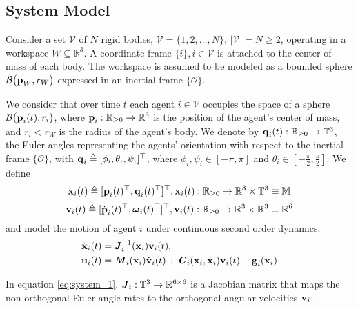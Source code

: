 \subsection{System Model}

Consider a set $\mathcal{V}$ of $N$ rigid bodies,
$\mathcal{V} = \{ 1,2, \ldots, N\}$, $|\mathcal{V}| = N \geq 2$, operating in
a workspace $W\subseteq \mathbb{R}^3$. A coordinate frame
$\{i\}, i\in\mathcal{V}$ is attached to the center of mass of each body.
The workspace is assumed to be modeled as a
bounded sphere $\mathcal{B}\big(\bm{\mathbf{p}}_W,r_W\big)$ expressed in an inertial frame
$\{\mathcal{O}\}$.

We consider that over time $t$ each agent $i \in \mathcal{V}$ occupies the
space of a sphere $\mathcal{B}\big(\bm{\mathbf{p}}_i(t), r_i\big)$, where
$\bm{\mathbf{p}}_i : \mathbb{R}_{\geq 0} \to \mathbb{R}^3$
is the position of the agent's center of mass, and $r_i < r_W$ is the radius of the
agent's body. We denote by $\bm{\mathbf{q}}_i(t):\mathbb{R}_{\geq 0} \to \mathbb{T}^3$,
the Euler angles representing the agents' orientation with respect to the
inertial frame $\{\mathcal{O}\}$,
with $\bm{\mathbf{q}}_i \triangleq [\phi_i,\theta_i,\psi_i]^{\top}$, where
$\phi_i, \psi_i \in [-\pi, \pi]$ and
$\theta_i \in [-\frac{\pi}{2}, \frac{\pi}{2}]$. We define
$$\bm{\mathbf{x}}_i (t)\triangleq [\bm{\mathbf{p}}_i(t)^{\top},\bm{\mathbf{q}}_i(t)^{\top}]^{\top},
\bm{\mathbf{x}}_i(t):\mathbb{R}_{\geq 0} \to \mathbb{R}^3\times \mathbb{T}^3 \equiv \mathbb{M}$$
$$\bm{\mathbf{v}}_i(t) \triangleq [\dot{\bm{\mathbf{p}}}_i(t)^{\top}, \bm{\mathbf{\omega}}_i(t)^{\top}]^{\top},
\bm{\mathbf{v}}_i(t) : \mathbb{R}_{\geq 0} \to \mathbb{R}^3\times \mathbb{R}^3 \equiv \mathbb{R}^6$$
and model the motion of agent $i$ under continuous second order dynamics:
\begin{subequations}
	\begin{align}
    \dot{\bm{\mathbf{x}}}_i(t) &= \bm{\mathit{J}}_i^{-1}(\bm{\mathbf{x}}_i) \bm{\mathbf{v}}_i(t), \label{eq:system_1} \\
    \bm{\mathbf{u}}_i(t) &= \bm{\mathit{M}}_i(\bm{\mathbf{x}}_i) \dot{\bm{\mathbf{v}}}_i(t) +
      \bm{\mathit{C}}_i(\bm{\mathbf{x}}_i,\dot{\bm{\mathbf{x}}}_i) \bm{\mathbf{v}}_i(t)+\bm{\mathbf{g}}_i(\bm{\mathbf{x}}_i) \label{eq:system_2}
	\end{align}
  \label{eq:system}
\end{subequations}

In equation \eqref{eq:system_1}, $\bm{\mathit{J}}_i:\mathbb{T}^3 \to \mathbb{R}^{6\times6}$ is
a Jacobian matrix that maps the non-orthogonal Euler angle rates to the
orthogonal angular velocities $\bm{\mathbf{v}}_i$:

